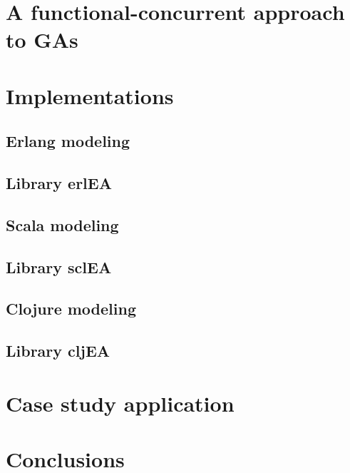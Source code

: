 \documentclass[a4paper]{llncs}
\begin{document}
\section{A functional-concurrent approach to GAs}
\label{sec:design}
    

\section{Implementations}
\label{sec:impl}
    

\subsection{Erlang modeling}
    

\subsection{Library erlEA}
    

\subsection{Scala modeling}
    

\subsection{Library sclEA}
    

\subsection{Clojure modeling}
    

\subsection{Library cljEA}
    

\section{Case study application}
\label{sec:results}
    

\section{Conclusions}
\label{sec:conclusions}
    


%




\end{document}
